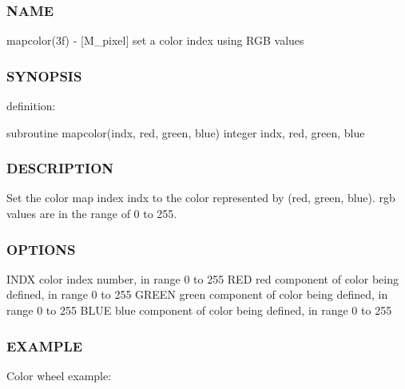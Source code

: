 \subsubsection*{N\+A\+ME}

mapcolor(3f) -\/ \mbox{[}M\+\_\+pixel\mbox{]} set a color index using R\+GB values 

\subsubsection*{S\+Y\+N\+O\+P\+S\+IS}

definition\+:

subroutine mapcolor(indx, red, green, blue) integer indx, red, green, blue

\subsubsection*{D\+E\+S\+C\+R\+I\+P\+T\+I\+ON}

Set the color map index indx to the color represented by (red, green, blue). rgb values are in the range of 0 to 255.

\subsubsection*{O\+P\+T\+I\+O\+NS}

I\+N\+DX color index number, in range 0 to 255 R\+ED red component of color being defined, in range 0 to 255 G\+R\+E\+EN green component of color being defined, in range 0 to 255 B\+L\+UE blue component of color being defined, in range 0 to 255

\subsubsection*{E\+X\+A\+M\+P\+LE}

Color wheel example\+:

